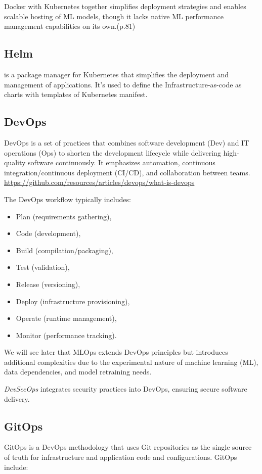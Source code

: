 Docker with Kubernetes together simplifies deployment strategies and enables scalable hosting of ML models,
though it lacks native ML performance management capabilities on its own.\cite{treveil2020introducing}(p.81)

\subsection{Helm}\label{subsec:helm}
is a package manager for Kubernetes that simplifies the deployment and management of applications\cite{9792270}.
It's used to define the Infrastructure-as-code as charts with templates of Kubernetes manifest.

\subsection{DevOps}\label{subsec:devops}
DevOps is a set of practices that combines software development (Dev) and IT
operations (Ops) to shorten the development lifecycle while delivering
high-quality software continuously.
It emphasizes automation, continuous integration/continuous deployment (CI/CD), and collaboration between
teams. \url{https://github.com/resources/articles/devops/what-is-devops}

The DevOps workflow typically includes:

\begin{itemize}
    \item Plan (requirements gathering),
    \item Code (development),
    \item Build (compilation/packaging),
    \item Test (validation),
    \item Release (versioning),
    \item Deploy (infrastructure provisioning),
    \item Operate (runtime management),
    \item Monitor (performance tracking).
\end{itemize}
We will see later that MLOps
 extends DevOps principles but introduces additional complexities due to
 the experimental nature of machine learning (ML), data dependencies,
and model retraining needs.

\textit{DevSecOps} integrates security practices into DevOps, ensuring secure software delivery.

\subsection{GitOps}\label{subsec:gitops}
GitOps\cite{gitops} is a DevOps methodology that uses Git repositories as the single source of truth for infrastructure and application code and configurations\cite{inproceedings}.
GitOps include:

